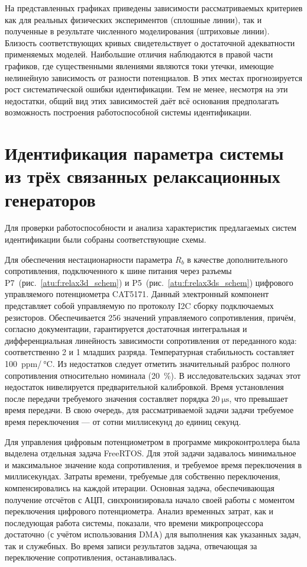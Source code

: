На представленных графиках приведены зависимости рассматриваемых критериев
как для реальных физических экспериментов (сплошные линии),
так и полученные в результате численного моделирования (штриховые линии).
Близость соответствующих кривых свидетельствует
о достаточной адекватности применяемых моделей.
Наибольшие отличия наблюдаются в правой части графиков, где существенными
явлениями являются токи утечки, имеющие нелинейную зависимость от разности потенциалов.
В этих местах прогнозируется рост систематической ошибки идентификации.
Тем не менее, несмотря на эти недостатки, общий вид этих зависимостей
даёт всё основания предполагать возможность построения работоспособной системы идентификации.


\section{Идентификация параметра системы из трёх связанных релаксационных генераторов}

Для проверки работоспособности и анализа
характеристик предлагаемых систем идентификации
были собраны соответствующие схемы.

Для обеспечения нестационарности параметра $R_b$
в качестве дополнительного сопротивления,
подключенного к шине питания через разъемы
P7~(рис.~\ref{atu:f:relax3d_schem}) и
P5~(рис.~\ref{atu:f:relax3ds_schem})
цифрового управляемого потенциометра CAT5171.
Данный электронный компонент представляет собой
управляемую по протоколу I2C сборку подключаемых резисторов.
Обеспечивается 256 значений управляемого сопротивления,
причём, согласно документации, гарантируется достаточная интегральная и
дифференциальная линейность зависимости сопротивления
от переданного кода: соответственно 2 и 1 младших разряда.
Температурная стабильность составляет 100~ppm/${}\SI{}{\celsius} $.
Из недостатков следует отметить значительный разброс полного сопротивления
относительно номинала (20~\%). В исследовательских
задачах этот недостаток нивелируется предварительной калибровкой.
Время установления после передачи требуемого значения составляет порядка
$\SI{20}{\micro\second}$,
что превышает время передачи. В свою очередь,
для рассматриваемой задачи задачи требуемое время
переключения --- от сотни миллисекунд до единиц секунд.

Для управления цифровым потенциометром в программе микроконтроллера была выделена
отдельная задача FreeRTOS. Для этой задачи задавалось
минимальное и максимальное значение кода сопротивления,
и требуемое время переключения в миллисекундах.
Затраты времени, требуемые для собственно переключения,
компенсировались на каждой итерации.
Основная задача, обеспечивающая получение отсчётов с АЦП,
синхронизировала начало своей работы
с моментом переключения цифрового потенциометра.
Анализ временных затрат, как и последующая работа системы,
показали, что времени микропроцессора достаточно (с учётом использования DMA)
для выполнения как указанных задач, так и служебных.
Во время записи результатов задача, отвечающая
за переключение сопротивления, останавливалась.

